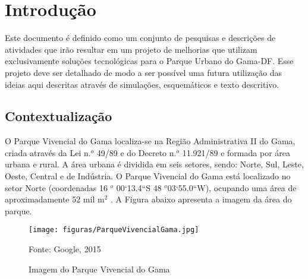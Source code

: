 \chapter*[Introdução]{Introdução}

Este documento é definido como um conjunto de pesquisas e descri\c{c}\~oes de atividades que ir\~ao resultar em um projeto de melhorias que utilizam exclusivamente solu\c{c}\~oes tecnol\'ogicas para o Parque Urbano do Gama-DF. Esse projeto deve ser detalhado de modo a ser poss\'ivel uma futura utiliza\c{c}\~ao das ideias aqui descritas atrav\'es de simula\c{c}\~oes, esquem\'aticos e texto descritivo. 

\section{Contextualiza\c{c}\~ao}

O Parque Vivencial do Gama localiza-se na Regi\~ao Administrativa II do Gama, criada atrav\'es da Lei n.$^o$ 49/89 e do Decreto n.$^o$ 11.921/89 e formada por \'area urbana e rural. A \'area urbana \'e dividida em seis setores, sendo: Norte, Sul, Leste, Oeste, Central e de Ind\'ustria. O Parque Vivencial do Gama est\'a localizado no setor Norte (coordenadas 16 $^o$ 00`13.4``S 48 $^o$03`55.0``W), ocupando uma \'area de aproximadamente 52 mil m$^{2}$ \cite{COEX}. A Figura abaixo apresenta a imagem da \'area do parque.

\begin{figure}[H]
	\centering
	\label{Imagem do Parque Vivencial do Gama}
		\texttt{[image: figuras/ParqueVivencialGama.jpg]}
	\caption{Imagem do Parque Vivencial do Gama}
	\small{Fonte: Google, 2015}
\end{figure}
